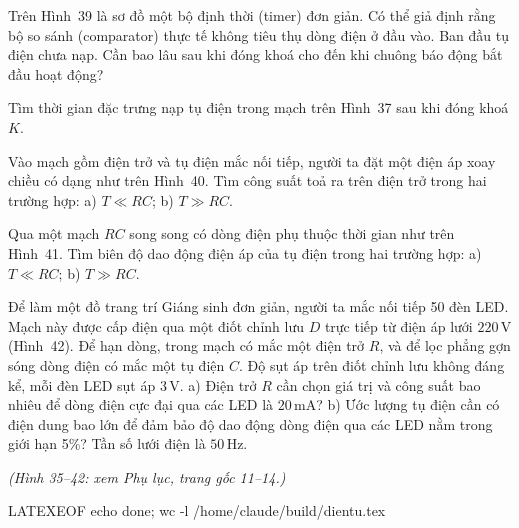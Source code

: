 
 Trên Hình~39 là sơ đồ một bộ định thời (timer) đơn giản. Có thể giả định rằng bộ so sánh (comparator) thực tế không tiêu thụ dòng điện ở đầu vào. Ban đầu tụ điện chưa nạp. Cần bao lâu sau khi đóng khoá cho đến khi chuông báo động bắt đầu hoạt động?


 Tìm thời gian đặc trưng nạp tụ điện trong mạch trên Hình~37 sau khi đóng khoá $K$.


 Vào mạch gồm điện trở và tụ điện mắc nối tiếp, người ta đặt một điện áp xoay chiều có dạng như trên Hình~40. Tìm công suất toả ra trên điện trở trong hai trường hợp: a) $T \ll RC$; b) $T \gg RC$.


 Qua một mạch $RC$ song song có dòng điện phụ thuộc thời gian như trên Hình~41. Tìm biên độ dao động điện áp của tụ điện trong hai trường hợp: a) $T \ll RC$; b) $T \gg RC$.


 Để làm một đồ trang trí Giáng sinh đơn giản, người ta mắc nối tiếp 50 đèn LED. Mạch này được cấp điện qua một điốt chỉnh lưu $D$ trực tiếp từ điện áp lưới $220\,\mathrm{V}$ (Hình~42). Để hạn dòng, trong mạch có mắc một điện trở $R$, và để lọc phẳng gợn sóng dòng điện có mắc một tụ điện $C$. Độ sụt áp trên điốt chỉnh lưu không đáng kể, mỗi đèn LED sụt áp $3\,\mathrm{V}$. a) Điện trở $R$ cần chọn giá trị và công suất bao nhiêu để dòng điện cực đại qua các LED là $20\,\mathrm{mA}$? b) Ước lượng tụ điện cần có điện dung bao lớn để đảm bảo độ dao động dòng điện qua các LED nằm trong giới hạn 5\%? Tần số lưới điện là $50\,\mathrm{Hz}$.


\emph{(Hình 35--42: xem Phụ lục, trang gốc 11--14.)}

LATEXEOF
echo done; wc -l /home/claude/build/dientu.tex
